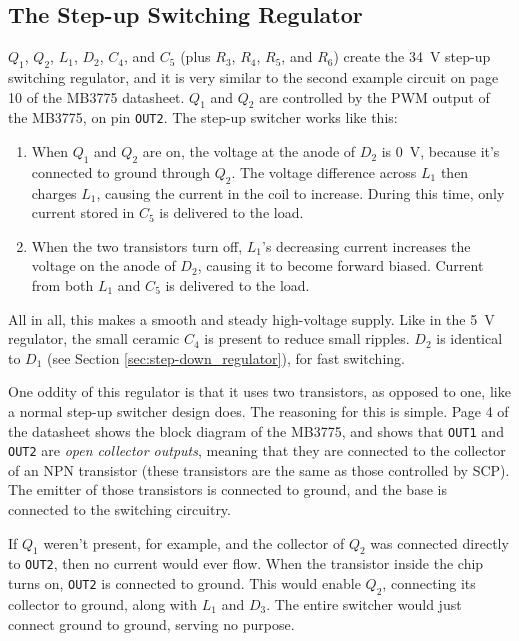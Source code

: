 \documentclass{article}
\newcommand{\chippin}{\texttt}
\newcommand{\model}{\textsf}
\begin{document}
\subsection{The Step-up Switching Regulator}
\label{sec:step-up_regulator}
$Q_1$, $Q_2$, $L_1$, $D_2$, $C_4$, and $C_5$ (plus $R_3$, $R_4$,
$R_5$, and $R_6$) create the \qty{34}{\volt} step-up switching
regulator, and it is very similar to the second example circuit on
page 10 of the \model{MB3775} datasheet. $Q_1$ and $Q_2$ are
controlled by the PWM output of the \model{MB3775}, on pin
\chippin{OUT2}. The step-up switcher works like this:

\begin{enumerate}
\item When $Q_1$ and $Q_2$ are on, the voltage at the anode of $D_2$
  is \qty{0}{\volt}, because it's connected to ground through
  $Q_2$. The voltage difference across $L_1$ then charges $L_1$,
  causing the current in the coil to increase. During this time, only
  current stored in $C_5$ is delivered to the load.
\item When the two transistors turn off, $L_1$'s decreasing current
  increases the voltage on the anode of $D_2$, causing it to become
  forward biased. Current from both $L_1$ and $C_5$ is delivered to
  the load.
\end{enumerate}

All in all, this makes a smooth and steady high-voltage supply. Like
in the \qty{5}{\volt} regulator, the small ceramic $C_4$ is present to
reduce small ripples. $D_2$ is identical to $D_1$ (see Section
\ref{sec:step-down_regulator}), for fast switching.

One oddity of this regulator is that it uses two transistors, as
opposed to one, like a normal step-up switcher design does. The
reasoning for this is simple. Page 4 of the datasheet shows the block
diagram of the \model{MB3775}, and shows that \chippin{OUT1} and
\chippin{OUT2} are \textit{open collector outputs}, meaning that they
are connected to the collector of an NPN transistor (these transistors
are the same as those controlled by SCP). The emitter of those
transistors is connected to ground, and the base is connected to the
switching circuitry.

If $Q_1$ weren't present, for example, and the collector of $Q_2$ was
connected directly to \chippin{OUT2}, then no current would ever
flow. When the transistor inside the chip turns on, \chippin{OUT2} is
connected to ground. This would enable $Q_2$, connecting its collector
to ground, along with $L_1$ and $D_3$. The entire switcher would just
connect ground to ground, serving no purpose.
\end{document}
